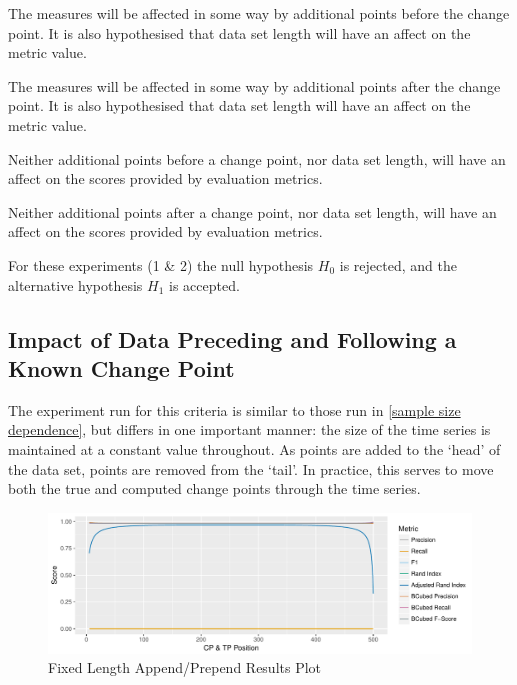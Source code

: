 \documentclass[../main.tex]{subfiles}
\begin{document}
\begin{hypothesis*}
    The measures will be affected in some way by additional points before the change point. It is also hypothesised that data set length will have an affect on the metric value.
\end{hypothesis*}

\begin{hypothesis*}
    The measures will be affected in some way by additional points after the change point. It is also hypothesised that data set length will have an affect on the metric value.
\end{hypothesis*}

\begin{nullhypothesis*}
    Neither additional points before a change point, nor data set length, will have an affect on the scores provided by evaluation metrics.
\end{nullhypothesis*}

\begin{nullhypothesis*}
    Neither additional points after a change point, nor data set length, will have an affect on the scores provided by evaluation metrics.
\end{nullhypothesis*}

For these experiments (1 \& 2) the null hypothesis $H_0$ is rejected, and the alternative hypothesis $H_1$ is accepted.

\subsection{Impact of Data Preceding and Following a Known Change Point}

The experiment run for this criteria is similar to those run in \autoref{sample size dependence}, but differs in one important manner: the size of the time series is maintained at a constant value throughout. As points are added to the `head' of the data set, points are removed from the `tail'. In practice, this serves to move both the true and computed change points through the time series.

\begin{figure}[h]
    \includegraphics[width=\textwidth]{figures/Experiment2}
    \caption{Fixed Length Append/Prepend Results Plot}
    \label{fig:Experiment3}
\end{figure}
\end{document}
